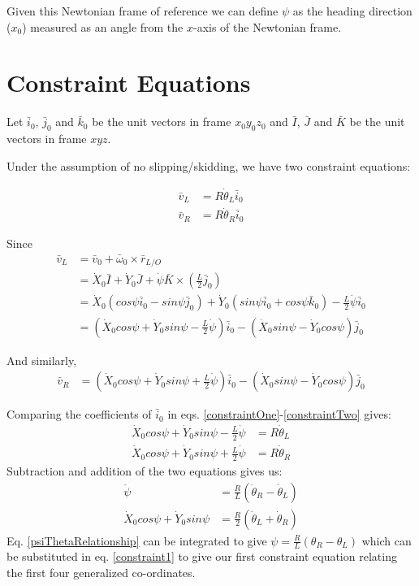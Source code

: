 \documentclass[a4paper,10pt]{article}
\begin{document}
Given this Newtonian frame of reference we can define $\psi$ as the heading direction ($x_0$) measured as
an angle from the $x$-axis of the Newtonian frame.

\section{Constraint Equations}
Let $\bar{i}_0$, $\bar{j}_0$ and $\bar{k}_0$ be the unit vectors in frame $x_0y_0z_0$ and $\bar{I}$, $\bar{J}$ and 
$\bar{K}$ be the unit vectors in frame $xyz$.

Under the assumption of no slipping/skidding, we have two constraint equations:

\begin{align} 
 \bar{v}_L &= R\dot\theta_L\bar{i}_0 \label{constraintOne}\\
 \bar{v}_R &= R\dot\theta_R\bar{i}_0 \label{constraintTwo}
\end{align}

Since
\begin{align}
 \bar{v}_L &= \bar{v}_0 + \bar\omega_0 \times \bar{r}_{L/O} \nonumber \\
 &= \dot{X}_0 \bar{I} + \dot{Y}_0 \bar{J} + \dot{\psi} \bar{K} \times (\frac{L}{2}\bar{j}_0) \nonumber \\
 &= \dot{X}_0 (cos\psi\bar{i}_0 - sin\psi\bar{j}_0) + \dot{Y}_0 (sin\psi\bar{i}_0+cos\psi\bar{k}_0) - \frac{L}{2}\dot{\psi} \bar{i}_0 \nonumber \\
 &= (\dot{X}_0 cos\psi + \dot{Y}_0 sin\psi - \frac{L}{2}\dot{\psi}) \bar{i}_0 - (\dot{X}_0 sin\psi - \dot{Y}_0 cos\psi)\bar{j}_0 \nonumber 
\end{align}

And similarly,
\begin{align}
 \bar{v}_R  &= (\dot{X}_0 cos\psi + \dot{Y}_0 sin\psi + \frac{L}{2}\dot{\psi}) \bar{i}_0 - (\dot{X}_0 sin\psi - \dot{Y}_0 cos\psi)\bar{j}_0 \nonumber 
\end{align}

Comparing the coefficients of $\bar{i}_0$ in eqs. \ref{constraintOne}-\ref{constraintTwo} gives:
\begin{align}
 \dot{X}_0 cos\psi + \dot{Y}_0 sin\psi - \frac{L}{2}\dot{\psi} &= R\dot\theta_L \label{thetaL} \\
 \dot{X}_0 cos\psi + \dot{Y}_0 sin\psi + \frac{L}{2}\dot{\psi} &= R\dot\theta_R \label{thetaR} 
\end{align}
Subtraction and addition of the two equations gives us:
\begin{align}
 \dot{\psi} &= \frac{R}{L}(\dot\theta_R - \dot\theta_L) \label{psiThetaRelationship} \\
 \dot{X}_0 cos\psi + \dot{Y}_0 sin\psi &= \frac{R}{2}(\dot\theta_L + \dot\theta_R) \label{constraint1} 
\end{align}
Eq. \ref{psiThetaRelationship} can be integrated to give $\psi = \frac{R}{L}(\theta_R - \theta_L)$ which can be substituted in
eq. \ref{constraint1} to give our first constraint equation relating the first four generalized co-ordinates.
\end{document}
